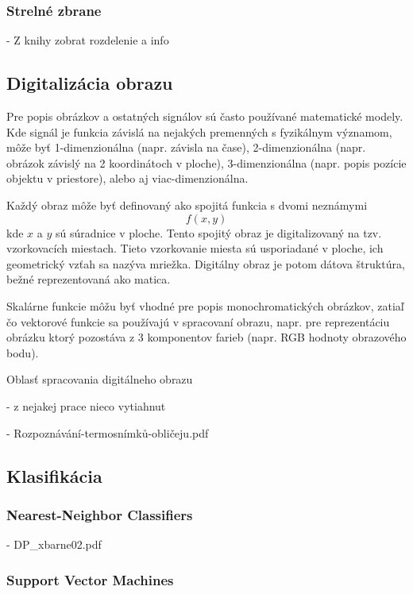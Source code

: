 \documentclass[10pt,a4paper]{article}
\begin{document}
\subsubsection{Strelné zbrane}
- Z knihy zobrat rozdelenie a info

\subsection{Digitalizácia obrazu}
Pre popis obrázkov a ostatných signálov sú často používané matematické modely.
Kde signál je funkcia závislá na nejakých premenných s fyzikálnym významom, môže byť 1-dimenzionálna (napr. závisla na čase),
    2-dimenzionálna (napr. obrázok závislý na 2 koordinátoch v ploche), 3-dimenzionálna (napr. popis pozície objektu v priestore), alebo aj viac-dimenzionálna.

    Každý obraz môže byť definovaný ako spojitá funkcia s dvomi neznámymi $$f(x,y)$$ kde $x$ a $y$ sú súradnice v ploche.
Tento spojitý obraz je digitalizovaný na tzv. vzorkovacích miestach.
Tieto vzorkovanie miesta sú usporiadané v ploche, ich geometrický vzťah sa nazýva mriežka.
Digitálny obraz je potom dátova štruktúra, bežné reprezentovaná ako matica.

Skalárne funkcie môžu byť vhodné pre popis monochromatických obrázkov, zatiaľ čo vektorové funkcie sa používajú v spracovaní obrazu, napr. pre reprezentáciu obrázku ktorý pozostáva z 3 komponentov farieb (napr. RGB hodnoty obrazového bodu).

Oblasť spracovania digitálneho obrazu




- z nejakej prace nieco vytiahnut

- Rozpoznávání-termosnímků-obličeju.pdf



\subsection{Klasifikácia}

\subsubsection{Nearest-Neighbor Classifiers}
- DP\_xbarne02.pdf

\subsubsection{Support Vector Machines}
\end{document}
